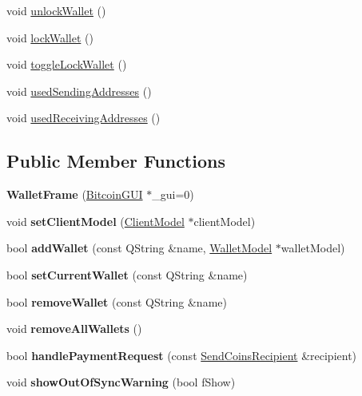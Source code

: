 \begin{DoxyCompactItemize}
\item 
void \mbox{\hyperlink{class_wallet_frame_a31b6e87c87b383ef53225b6c2b37f057}{unlock\+Wallet}} ()
\item 
void \mbox{\hyperlink{class_wallet_frame_a0b94aa3ff7ae9ea4d3e31b038d8b9b25}{lock\+Wallet}} ()
\item 
void \mbox{\hyperlink{class_wallet_frame_aabe09da444c11859a0fc19e923ce0792}{toggle\+Lock\+Wallet}} ()
\item 
void \mbox{\hyperlink{class_wallet_frame_a7f697d220e7ea40d6e4d6e6c5e9ef3b4}{used\+Sending\+Addresses}} ()
\item 
void \mbox{\hyperlink{class_wallet_frame_a9273a0b98cf7ec9fc344658c38a4a0a3}{used\+Receiving\+Addresses}} ()
\end{DoxyCompactItemize}
\subsection*{Public Member Functions}
\begin{DoxyCompactItemize}
\item 
\mbox{\label{class_wallet_frame_aa31b1844a2d17e4ad297e6b0cbe57c48}} 
{\bfseries Wallet\+Frame} (\mbox{\hyperlink{class_bitcoin_g_u_i}{Bitcoin\+G\+UI}} $\ast$\+\_\+gui=0)
\item 
\mbox{\label{class_wallet_frame_a72f3a61b1d882a894c65fbf1adc1a954}} 
void {\bfseries set\+Client\+Model} (\mbox{\hyperlink{class_client_model}{Client\+Model}} $\ast$client\+Model)
\item 
\mbox{\label{class_wallet_frame_aa199c3f27654199d84c365cf86167d86}} 
bool {\bfseries add\+Wallet} (const Q\+String \&name, \mbox{\hyperlink{class_wallet_model}{Wallet\+Model}} $\ast$wallet\+Model)
\item 
\mbox{\label{class_wallet_frame_ab6d4f86307bf1b28b53c2583c5166905}} 
bool {\bfseries set\+Current\+Wallet} (const Q\+String \&name)
\item 
\mbox{\label{class_wallet_frame_a1d9bd941464bb92318851855e0f8ddc6}} 
bool {\bfseries remove\+Wallet} (const Q\+String \&name)
\item 
\mbox{\label{class_wallet_frame_a022ecdc6281ee7ac3dc2618b5a150e93}} 
void {\bfseries remove\+All\+Wallets} ()
\item 
\mbox{\label{class_wallet_frame_aa8c5b10f2240df164795619ca41c619c}} 
bool {\bfseries handle\+Payment\+Request} (const \mbox{\hyperlink{class_send_coins_recipient}{Send\+Coins\+Recipient}} \&recipient)
\item 
\mbox{\label{class_wallet_frame_aeda920e4141c99d457814f20fa89dde6}} 
void {\bfseries show\+Out\+Of\+Sync\+Warning} (bool f\+Show)
\end{DoxyCompactItemize}


